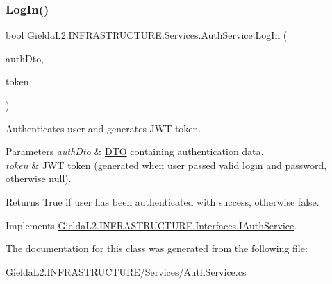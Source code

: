 \subsubsection{\texorpdfstring{LogIn()}{LogIn()}}
{\footnotesize\ttfamily bool Gielda\+L2.\+I\+N\+F\+R\+A\+S\+T\+R\+U\+C\+T\+U\+R\+E.\+Services.\+Auth\+Service.\+Log\+In (\begin{DoxyParamCaption}\item[{\mbox{\hyperlink{class_gielda_l2_1_1_i_n_f_r_a_s_t_r_u_c_t_u_r_e_1_1_d_t_o_1_1_auth_d_t_o}{Auth\+D\+TO}}}]{auth\+Dto,  }\item[{out string}]{token }\end{DoxyParamCaption})}



Authenticates user and generates J\+WT token. 


\begin{DoxyParams}{Parameters}
{\em auth\+Dto} & \mbox{\hyperlink{namespace_gielda_l2_1_1_i_n_f_r_a_s_t_r_u_c_t_u_r_e_1_1_d_t_o}{D\+TO}} containing authentication data.\\
\hline
{\em token} & J\+WT token (generated when user passed valid login and password, otherwise null).\\
\hline
\end{DoxyParams}
\begin{DoxyReturn}{Returns}
True if user has been authenticated with success, otherwise false.
\end{DoxyReturn}


Implements \mbox{\hyperlink{interface_gielda_l2_1_1_i_n_f_r_a_s_t_r_u_c_t_u_r_e_1_1_interfaces_1_1_i_auth_service_a9228c59864a95e038b513ee771f398bb}{Gielda\+L2.\+I\+N\+F\+R\+A\+S\+T\+R\+U\+C\+T\+U\+R\+E.\+Interfaces.\+I\+Auth\+Service}}.



The documentation for this class was generated from the following file\+:\begin{DoxyCompactItemize}
\item 
Gielda\+L2.\+I\+N\+F\+R\+A\+S\+T\+R\+U\+C\+T\+U\+R\+E/\+Services/Auth\+Service.\+cs\end{DoxyCompactItemize}
